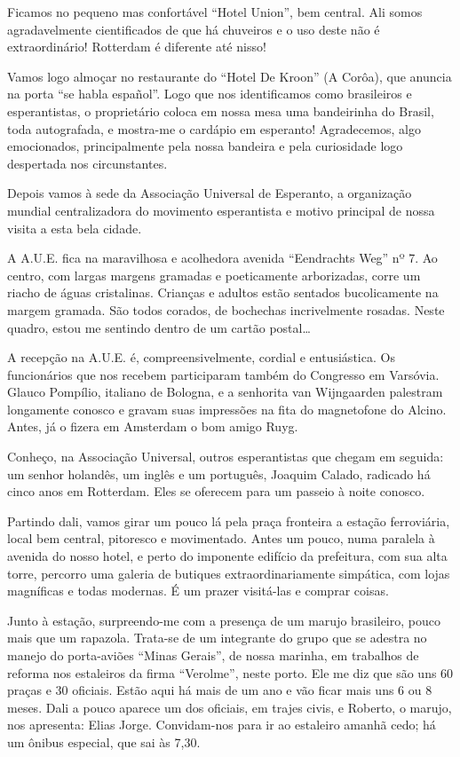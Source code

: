 Ficamos no pequeno mas confortável “Hotel Union”, bem central. Ali somos agradavelmente cientificados de que há chuveiros e o uso deste não é extraordinário! Rotterdam é diferente até nisso!

Vamos logo almoçar no restaurante do “Hotel De Kroon” (A Corôa), que anuncia na porta “se habla español”. Logo que nos identificamos como brasileiros e esperantistas, o proprietário coloca em nossa mesa uma bandeirinha do Brasil, toda autografada, e mostra-me o cardápio em esperanto! Agradecemos, algo emocionados, principalmente pela nossa bandeira e pela curiosidade logo despertada nos circunstantes.

Depois vamos à sede da Associação Universal de Esperanto, a organização mundial centralizadora do movimento esperantista e motivo principal de nossa visita a esta bela cidade.

A A.U.E. fica na maravilhosa e acolhedora avenida “Eendrachts Weg” nº 7. Ao centro, com largas margens gramadas e poeticamente arborizadas, corre um riacho de águas cristalinas. Crianças e adultos estão sentados bucolicamente na margem gramada. São todos corados, de bochechas incrivelmente rosadas. Neste quadro, estou me sentindo dentro de um cartão postal\ldots

A recepção na A.U.E. é, compreensivelmente, cordial e entusiástica. Os funcionários que nos recebem participaram também do Congresso em Varsóvia. Glauco Pompílio, italiano de Bologna, e a senhorita van Wijngaarden palestram longamente conosco e gravam suas impressões na fita do magnetofone do Alcino. Antes, já o fizera em Amsterdam o bom amigo Ruyg.

Conheço, na Associação Universal, outros esperantistas que chegam em seguida: um senhor holandês, um inglês e um português, Joaquim Calado, radicado há cinco anos em Rotterdam. Eles se oferecem para um passeio à noite conosco.

Partindo dali, vamos girar um pouco lá pela praça fronteira a estação ferroviária, local bem central, pitoresco e movimentado. Antes um pouco, numa paralela à avenida do nosso hotel, e perto do imponente edifício da prefeitura, com sua alta torre, percorro uma galeria de butiques extraordinariamente simpática, com lojas magníficas e todas modernas. É um prazer visitá-las e comprar coisas.

Junto à estação, surpreendo-me com a presença de um marujo brasileiro, pouco mais que um rapazola. Trata-se de um integrante do grupo que se adestra no manejo do porta-aviões “Minas Gerais”, de nossa marinha, em trabalhos de reforma nos estaleiros da firma “Verolme”, neste porto. Ele me diz que são uns 60 praças e 30 oficiais. Estão aqui há mais de um ano e vão ficar mais uns 6 ou 8 meses. Dali a pouco aparece um dos oficiais, em trajes civis, e Roberto, o marujo, nos apresenta: Elias Jorge. Convidam-nos para ir ao estaleiro amanhã cedo; há um ônibus especial, que sai às 7,30.

